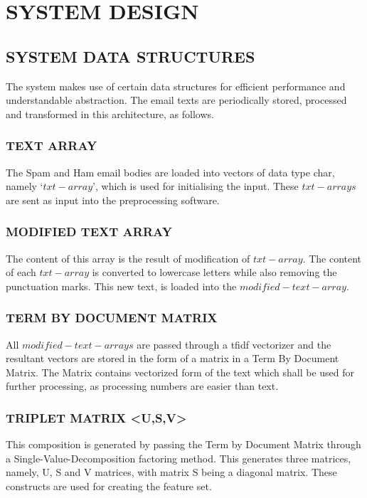 
\chapter{SYSTEM DESIGN} %

\section{SYSTEM DATA STRUCTURES}

The system makes use of certain data structures for efficient performance and understandable abstraction. The email texts are periodically stored, processed and transformed in this architecture, as follows.
\subsection{TEXT ARRAY} 
The Spam and Ham email bodies are loaded into vectors of data type char, namely ‘$txt-array$’, which is used for initialising the input. These $txt-arrays$ are sent as input into the preprocessing software.

\subsection{MODIFIED TEXT ARRAY}
The content of this array is the result of modification of $txt-array$. The content of each $txt-array$ is converted to lowercase letters while also removing the punctuation marks. This new text, is loaded into the $modified-text-array$.

\subsection{TERM BY DOCUMENT MATRIX}
All $modified-text-arrays$ are passed through a tfidf vectorizer and the resultant vectors are stored in the form of a matrix in a Term By Document Matrix. The Matrix contains vectorized form of the text which shall be used for further processing, as processing numbers are easier than text.
          
\subsection{TRIPLET MATRIX <U,S,V>}
This composition is generated  by passing the Term by Document Matrix through a Single-Value-Decomposition factoring method. This generates three matrices, namely, U, S and V matrices, with matrix S being a diagonal matrix. These constructs are used for creating the feature set.


